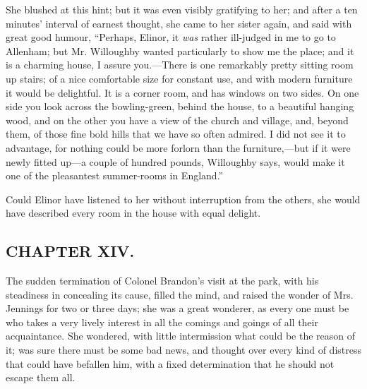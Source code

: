 

She blushed at this hint; but it was even visibly gratifying to her; and after a ten minutes' interval of earnest thought, she came to her sister again, and said with great good humour, “Perhaps, Elinor, it {\em was} rather ill-judged in me to go to Allenham; but Mr. Willoughby wanted particularly to show me the place; and it is a charming house, I assure you.---There is one remarkably pretty sitting room up stairs; of a nice comfortable size for constant use, and with modern furniture it would be delightful. It is a corner room, and has windows on two sides. On one side you look across the bowling-green, behind the house, to a beautiful hanging wood, and on the other you have a view of the church and village, and, beyond them, of those fine bold hills that we have so often admired. I did not see it to advantage, for nothing could be more forlorn than the furniture,---but if it were newly fitted up---a couple of hundred pounds, Willoughby says, would make it one of the pleasantest summer-rooms in England.”

Could Elinor have listened to her without interruption from the others, she would have described every room in the house with equal delight.

\subsection[chapter-xiv.]{\useURL[url14][][][]\from[url14]CHAPTER XIV.}

The sudden termination of Colonel Brandon's visit at the park, with his steadiness in concealing its cause, filled the mind, and raised the wonder of Mrs. Jennings for two or three days; she was a great wonderer, as every one must be who takes a very lively interest in all the comings and goings of all their acquaintance. She wondered, with little intermission what could be the reason of it; was sure there must be some bad news, and thought over every kind of distress that could have befallen him, with a fixed determination that he should not escape them all.


